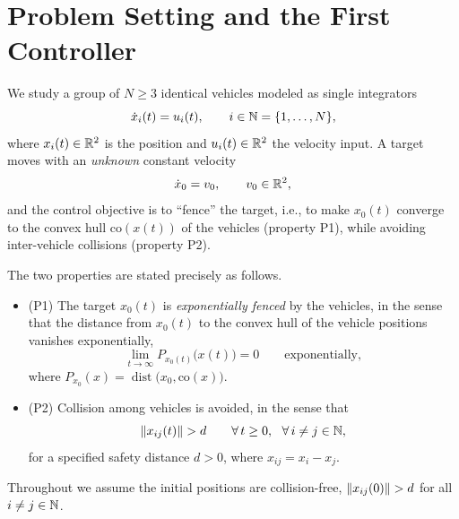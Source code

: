 \section{Problem Setting and the First Controller}

We study a group of $N\ge 3$ identical vehicles modeled as single integrators
\begin{equation}
  \dot{x}_i(t)=u_i(t),\qquad i\in\mathbb{N}=\{1,\dots,N\},
  \label{eq:veh}
\end{equation}
where $x_i(t)\in\mathbb{R}^2$ is the position and $u_i(t)\in\mathbb{R}^2$ the velocity input. A target moves with
an \emph{unknown} constant velocity
\begin{equation}
  \dot{x}_0=v_0,\qquad v_0\in\mathbb{R}^2,
  \label{eq:tgt}
\end{equation}
and the control objective is to ``fence'' the target, i.e., to make $x_0(t)$ converge to the convex
hull $\mathrm{co}(x(t))$ of the vehicles (property P1), while avoiding inter-vehicle collisions
(property P2).

The two properties are stated precisely as follows.
\begin{itemize}[leftmargin=2em]
  \item (P1) The target $x_0(t)$ is \emph{exponentially fenced} by the vehicles, in the sense that
        the distance from $x_0(t)$ to the convex hull of the vehicle positions vanishes
        exponentially,
        \begin{equation}
          \lim_{t\to\infty}P_{x_0(t)}\bigl(x(t)\bigr)=0
          \qquad\text{exponentially},
          \label{eq:P1}
        \end{equation}
        where $P_{x_0}(x)=\operatorname{dist}\bigl(x_0,\mathrm{co}(x)\bigr)$.
  \item (P2) Collision among vehicles is avoided, in the sense that
        \begin{equation}
          \norm{x_{ij}(t)}>d
          \qquad\forall\,t\ge0,\ \ \forall\,i\ne j\in\NN,
          \label{eq:P2}
        \end{equation}
        for a specified safety distance $d>0$, where $x_{ij}=x_i-x_j$.
\end{itemize}
Throughout we assume the initial positions are collision-free,
$\norm{x_{ij}(0)}>d$ for all $i\ne j\in\mathbb{N}$.

